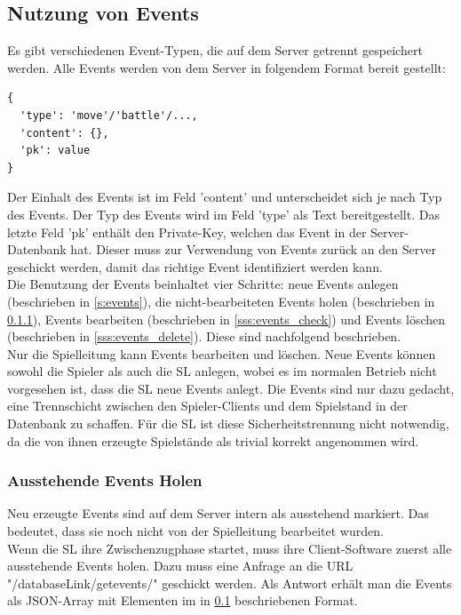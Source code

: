 \documentclass[11pt,a4paper,twocolumn]{article}
\begin{document}
\subsection{Nutzung von Events}\label{ss:events_use}
Es gibt verschiedenen Event-Typen, die auf dem Server getrennt gespeichert werden. Alle Events werden von dem Server in folgendem Format bereit gestellt:
\begin{lstlisting}
{
  'type': 'move'/'battle'/...,
  'content': {},
  'pk': value
}
\end{lstlisting}
Der Einhalt des Events ist im Feld 'content' und unterscheidet sich je nach Typ des Events. Der Typ des Events wird im Feld 'type' als Text bereitgestellt. Das letzte Feld 'pk' enthält den Private-Key, welchen das Event in der Server-Datenbank hat. Dieser muss zur Verwendung von Events zurück an den Server geschickt werden, damit das richtige Event identifiziert werden kann.\\
Die Benutzung der Events beinhaltet vier Schritte: neue Events anlegen (beschrieben in \ref{s:events}), die nicht-bearbeiteten Events holen (beschrieben in \ref{sss:events_pending}), Events bearbeiten (beschrieben in \ref{sss:events_check}) und Events löschen (beschrieben in \ref{sss:events_delete}). Diese sind nachfolgend beschrieben.\\
Nur die Spielleitung kann Events bearbeiten und löschen. Neue Events können sowohl die Spieler als auch die SL anlegen, wobei es im normalen Betrieb nicht vorgesehen ist, dass die SL neue Events anlegt. Die Events sind nur dazu gedacht, eine Trennschicht zwischen den Spieler-Clients und dem Spielstand in der Datenbank zu schaffen. Für die SL ist diese Sicherheitstrennung nicht notwendig, da die von ihnen erzeugte Spielstände als trivial korrekt angenommen wird.
\subsubsection{Ausstehende Events Holen}\label{sss:events_pending}
Neu erzeugte Events sind auf dem Server intern als ausstehend markiert. Das bedeutet, dass sie noch nicht von der Spielleitung bearbeitet wurden.\\
Wenn die SL ihre Zwischenzugphase startet, muss ihre Client-Software zuerst alle ausstehende Events holen. Dazu muss eine Anfrage an die URL "/databaseLink/getevents/" geschickt werden. Als Antwort erhält man die Events als JSON-Array mit Elementen im in \ref{ss:events_use} beschriebenen Format.
\end{document}
